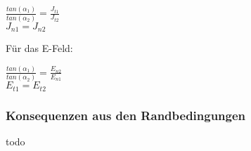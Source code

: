 					$\displaystyle \frac{tan(\alpha_1)}{tan(\alpha_2)} = \frac{J_{t1}}{J_{t2}}  $ \\
					\fspace
					$\displaystyle J_{n1} = J_{n2}$

					\formulaEnd

					Für das E-Feld:
					\fspace
					\formulaBegin

										$\displaystyle \frac{tan(\alpha_1)}{tan(\alpha_2)} = \frac{E_{n2}}{E_{n1}}  $ \\
										\fspace
										$\displaystyle E_{t1} = E_{t2}$

					\formulaEnd
					\iend



										\subsubsection{Konsequenzen aus den Randbedingungen}
										todo
